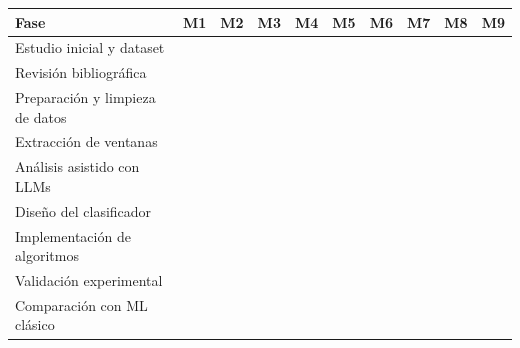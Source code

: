 \begin{table}[ht]
\centering
\scriptsize
\setlength{\tabcolsep}{4pt}
\begin{tabular}{|l|c|c|c|c|c|c|c|c|c|}
\hline
\textbf{Fase} & \textbf{M1} & \textbf{M2} & \textbf{M3} & \textbf{M4} & \textbf{M5} & \textbf{M6} & \textbf{M7} & \textbf{M8} & \textbf{M9} \\
\hline
Estudio inicial y dataset            & \cellcolor{gray75} &                    &                    &                    &                    &                    &                    &                    &                    \\
\hline
Revisión bibliográfica               & \cellcolor{gray75} & \cellcolor{gray75} &                    &                    &                    &                    &                    &                    &                    \\
\hline
Preparación y limpieza de datos      &                    & \cellcolor{gray75} &                    &                    &                    &                    &                    &                    &                    \\
\hline
Extracción de ventanas               &                    & \cellcolor{gray75} & \cellcolor{gray75} &                    &                    &                    &                    &                    &                    \\
\hline
Análisis asistido con LLMs           &                    &                    & \cellcolor{gray75} & \cellcolor{gray75} &                    &                    &                    &                    &                    \\
\hline
Diseño del clasificador             &                    &                    &                    & \cellcolor{gray75} & \cellcolor{gray75} &                    &                    &                    &                    \\
\hline
Implementación de algoritmos         &                    &                    &                    & \cellcolor{gray75} & \cellcolor{gray75} & \cellcolor{gray75} &                    &                    &                    \\
\hline
Validación experimental              &                    &                    &                    &                    &                    & \cellcolor{gray75} & \cellcolor{gray75} &                    &                    \\
\hline
Comparación con ML clásico           &                    &                    &                    &                    &                    &                    & \cellcolor{gray75} &                    &                    \\

\end{tabular}
\end{table}
